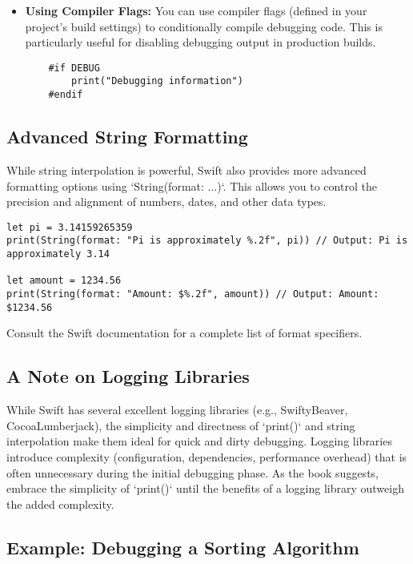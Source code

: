 \documentclass{article}
\begin{document}
{{{{\begin{itemize}
\begin{verbatim}
    if debugMode {
        print("Value: \(value)")
    }
    \end{verbatim}

    \item \textbf{Using Compiler Flags:} You can use compiler flags (defined in your project's build settings) to conditionally compile debugging code.  This is particularly useful for disabling debugging output in production builds.

    \begin{verbatim}
    #if DEBUG
        print("Debugging information")
    #endif
    \end{verbatim}
\end{itemize}

\subsection*{Advanced String Formatting}

While string interpolation is powerful, Swift also provides more advanced formatting options using `String(format: ...)`. This allows you to control the precision and alignment of numbers, dates, and other data types.

\begin{verbatim}
let pi = 3.14159265359
print(String(format: "Pi is approximately %.2f", pi)) // Output: Pi is approximately 3.14

let amount = 1234.56
print(String(format: "Amount: $%.2f", amount)) // Output: Amount: $1234.56
\end{verbatim}

Consult the Swift documentation for a complete list of format specifiers.

\subsection*{A Note on Logging Libraries}

While Swift has several excellent logging libraries (e.g., SwiftyBeaver, CocoaLumberjack), the simplicity and directness of `print()` and string interpolation make them ideal for quick and dirty debugging.  Logging libraries introduce complexity (configuration, dependencies, performance overhead) that is often unnecessary during the initial debugging phase. As the book suggests, embrace the simplicity of `print()` until the benefits of a logging library outweigh the added complexity.

\subsection*{Example: Debugging a Sorting Algorithm}

}}}}
\end{document}
